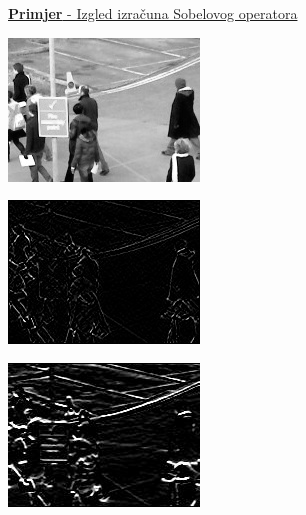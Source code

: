 \documentclass[times, utf8, zavrsni]{fer}
\begin{document}
\underline{\textbf{Primjer} - Izgled izračuna Sobelovog operatora}

\begin{multicols}{2}

\begin{minipage}{\linewidth}
\centering
\includegraphics[width=0.8\linewidth]{img/2982.jpg}
\end{minipage}

\begin{minipage}{\linewidth}
\centering
\includegraphics[width=0.8\linewidth]{img/sobel.jpg}
\end{minipage}

\begin{minipage}{\linewidth}
\centering
\includegraphics[width=0.8\linewidth]{img/sobely.jpg}
\end{minipage}


\end{multicols}
\end{document}
